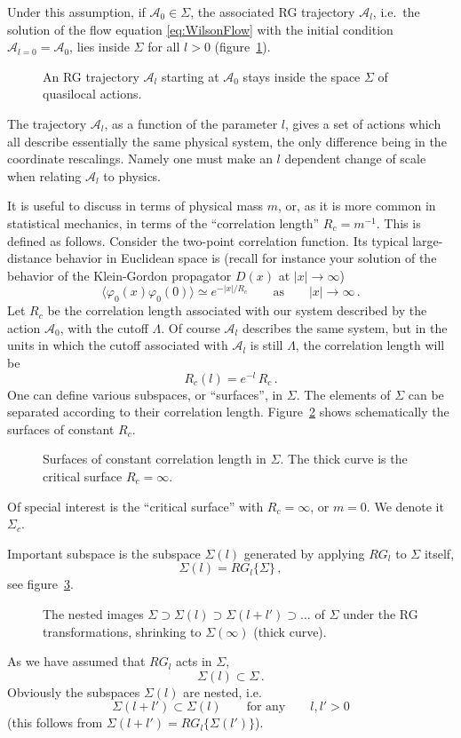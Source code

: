 Under this assumption, if $\mathcal A_0\in\Sigma$, the associated RG trajectory
$\mathcal A_l$, i.e.\ the solution of the flow equation \eqref{eq:WilsonFlow}
with the initial condition $\mathcal A_{l=0}=\mathcal A_0$, lies inside $\Sigma$
for all $l>0$ (figure~\ref{fig:trajectory}).
\begin{figure}[ht]
\centering{}
\caption{An RG trajectory $\mathcal A_l$ starting at $\mathcal A_0$ stays inside
the space $\Sigma$ of quasilocal actions.}
\label{fig:trajectory}
\end{figure}

The trajectory $\mathcal A_l$, as a function of the parameter $l$, gives a set of
actions which all describe essentially the same physical system, the only
difference being in the coordinate rescalings. Namely one must make an $l$
dependent change of scale when relating $\mathcal A_l$ to physics.

It is useful to discuss in terms of physical mass $m$, or, as it is more common in
statistical mechanics, in terms of the ``correlation length'' $R_c=m^{-1}$. This
is defined as follows. Consider the two-point correlation function. Its typical
large-distance behavior in Euclidean space is (recall for instance your solution
of the behavior of the Klein-Gordon propagator $D(x)$ at $|x|\to\infty$)
\[
\bigl\langle\varphi_0(x)\varphi_0(0)\bigr\rangle\simeq e^{-|x|/R_c}\qquad\text{as}\qquad|x|\to\infty\,.
\]
Let $R_c$ be the correlation length associated with our system described by the
action $\mathcal A_0$, with the cutoff $\Lambda$. Of course $\mathcal A_l$
describes the same system, but in the units in which the cutoff associated with
$\mathcal A_l$ is still $\Lambda$, the correlation length will be
\[
R_c(l)=e^{-l}\,R_c\,.
\]
One can define various subspaces, or ``surfaces'', in $\Sigma$. The elements of
$\Sigma$ can be separated according to their correlation length.
Figure~\ref{fig:Rcsurfaces} shows schematically the surfaces of constant $R_c$.
\begin{figure}[ht]
\centering{}
\caption{Surfaces of constant correlation length in $\Sigma$. The thick curve is
the critical surface $R_c=\infty$.}
\label{fig:Rcsurfaces}
\end{figure}

Of special interest is the ``critical surface'' with $R_c=\infty$, or $m=0$. We
denote it $\Sigma_c$.

Important subspace is the subspace $\Sigma(l)$ generated by applying $RG_l$ to
$\Sigma$ itself,
\[
\Sigma(l)=RG_l\{\Sigma\}\,,
\]
see figure~\ref{fig:nested}.
\begin{figure}[ht]
\centering{}
\caption{The nested images $\Sigma\supset\Sigma(l)\supset\Sigma(l+l')\supset\dots$
of $\Sigma$ under the RG transformations, shrinking to $\Sigma(\infty)$ (thick
curve).}
\label{fig:nested}
\end{figure}
As we have assumed that $RG_l$ acts in $\Sigma$,
\[
\Sigma(l)\subset\Sigma\,.
\]
Obviously the subspaces $\Sigma(l)$ are nested, i.e.
\[
\Sigma(l+l')\subset\Sigma(l)\qquad\text{for any}\qquad l,l'>0
\]
(this follows from $\Sigma(l+l')=RG_l\{\Sigma(l')\}$).

